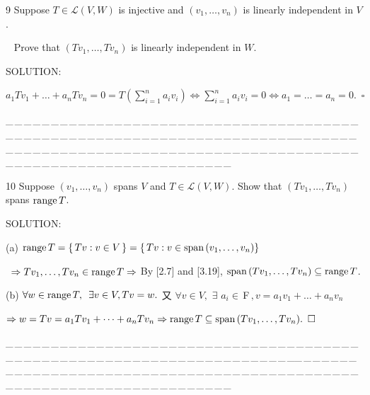 \documentclass[a4paper, 11pt, UTF8]{article}
\def\range{\textup{range}\,}
\def\Spn{\textup{span}\,}
\def\Lm{\mathcal{L}}
\def\Fbf{$\,{\timesbf F}\,$}
\begin{document}
\begin{large}
{\timesbf\Large 9} {\timessl\Large
Suppose $T\in\Lm(V, W)$ is injective and $(v_1,\dots,v_n)$ is linearly independent in $V$.}\par\,\,\,
{\timessl\Large Prove that $(Tv_1,\dots,Tv_n)$ is linearly independent in $W$.
}\par
{\timesbf S\footnotesize{OLUTION:}}\par\quad
$a_1 Tv_1+\dots+a_n Tv_n=0=T(\sum\limits_{i=1}^n a_i v_i)\Longleftrightarrow \sum\limits_{i=1}^n a_i v_i=0\Longleftrightarrow a_1=\dots=a_n=0.\,\,\,\square$\par
{\tiny \_\,\_\,\_\,\_\,\_\,\_\,\_\,\_\,\_\,\_\,\_\,\_\,\_\,\_\,\_\,\_\,\_\,\_\,\_\,\_\,\_\,\_\,\_\,\_\,\_\,\_\,\_\,\_\,\_\,\_\,\_\,\_\,\_\,\_\,\_\,\_\,\_\,\_\,\_\,\_\,\_\,\_\,\_\,\_\,\_\,\_\,\_\,\_\,\_\,\_\,\_\,\_\,\_\,\_\,\_\,\_\,\_\,\_\,\_\,\_\,\_\,\_\,\_\,\_\,\_\,\_\,\_\,\_\,\_\,\_\,\_\_\,\_\,\_\,\_\,\_\,\_\,\_\,\_\,\_\,\_\,\_\,\_\,\_\,\_\,\_\,\_\,\_\,\_\,\_\,\_\,\_\,\_\,\_\,\_\,\_\,\_\,\_\,\_\,\_\,\_\,\_\,\_\,\_\,\_\,\_\,\_\,\_\,\_\,\_\,\_\,\_\,\_\,\_\,\_\,\_\,\_\,\_\,\_\,\_\,\_\,\_\,\_\,\_\,\_\,\_\,\_\,\_\,\_\,\_\,\_\,\_\,\_\,\_\,\_\,\_\,\_\,\_\,\_\,\_\,\_\,\_}\par

{\timesbf\Large 10} {\timessl\Large 
Suppose $(v_1,\dots,v_n)$ spans $V$ and $T\in\Lm(V, W)$. Show that $(Tv_1,\dots,Tv_n)$ spans $\range T$.
}\par
{\timesbf S\footnotesize{OLUTION:}}\par\quad
(a) $\range T=\{\,Tv:v\in V\,\}=\{\,Tv:v\in\Spn(v_1,\dots,v_n)\}$\par\qquad\qquad\,
$\Rightarrow Tv_1,\dots,Tv_n\in\range T\Rightarrow$ By [2.7] and [3.19], $\Spn(Tv_1,\dots,Tv_n)\subseteq\range T$.\par\quad
(b) $\forall w\in\range T,\,\,\,\exists v\in V,Tv=w.$ 又 $\forall v\in V,\,\,\exists\,\,a_i\in\Fbf,v=a_1 v_1+\dots+a_n v_n$\par\qquad\qquad\qquad\quad
$\Rightarrow w=Tv=a_1 Tv_1+\dots+a_n Tv_n\Rightarrow\range T\subseteq\Spn(Tv_1,\dots,Tv_n).\,\,\,\square$
\par
{\tiny \_\,\_\,\_\,\_\,\_\,\_\,\_\,\_\,\_\,\_\,\_\,\_\,\_\,\_\,\_\,\_\,\_\,\_\,\_\,\_\,\_\,\_\,\_\,\_\,\_\,\_\,\_\,\_\,\_\,\_\,\_\,\_\,\_\,\_\,\_\,\_\,\_\,\_\,\_\,\_\,\_\,\_\,\_\,\_\,\_\,\_\,\_\,\_\,\_\,\_\,\_\,\_\,\_\,\_\,\_\,\_\,\_\,\_\,\_\,\_\,\_\,\_\,\_\,\_\,\_\,\_\,\_\,\_\,\_\,\_\,\_\_\,\_\,\_\,\_\,\_\,\_\,\_\,\_\,\_\,\_\,\_\,\_\,\_\,\_\,\_\,\_\,\_\,\_\,\_\,\_\,\_\,\_\,\_\,\_\,\_\,\_\,\_\,\_\,\_\,\_\,\_\,\_\,\_\,\_\,\_\,\_\,\_\,\_\,\_\,\_\,\_\,\_\,\_\,\_\,\_\,\_\,\_\,\_\,\_\,\_\,\_\,\_\,\_\,\_\,\_\,\_\,\_\,\_\,\_\,\_\,\_\,\_\,\_\,\_\,\_\,\_\,\_\,\_\,\_\,\_\,\_}\par


\end{large}
\end{document}
